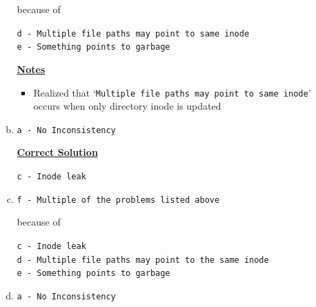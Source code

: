 \documentclass[12pt]{article}
\begin{document}
\begin{enumerate}[1.]
\begin{enumerate}[a)]
        because of

        \bigskip

        \texttt{d - Multiple file paths may point to same inode}\\
        \texttt{e - Something points to garbage}

        \bigskip

        \underline{\textbf{Notes}}

        \begin{itemize}
            \item Realized that `\texttt{Multiple file paths may point to same inode}' occurs when only directory inode is updated
        \end{itemize}

        \item

        \texttt{a - No Inconsistency}

        \bigskip

        \begin{mdframed}
        \underline{\textbf{Correct Solution}}

        \bigskip

        \color{red}\texttt{c - Inode leak}\color{black}

        \end{mdframed}

        \item

        \texttt{f - Multiple of the problems listed above}

        \bigskip

        because of

        \texttt{c - Inode leak}\\
        \texttt{d - Multiple file paths may point to the same inode}\\
        \texttt{e - Something points to garbage}

        \item

        \texttt{a - No Inconsistency}

    \end{enumerate}
\end{enumerate}
\end{document}

